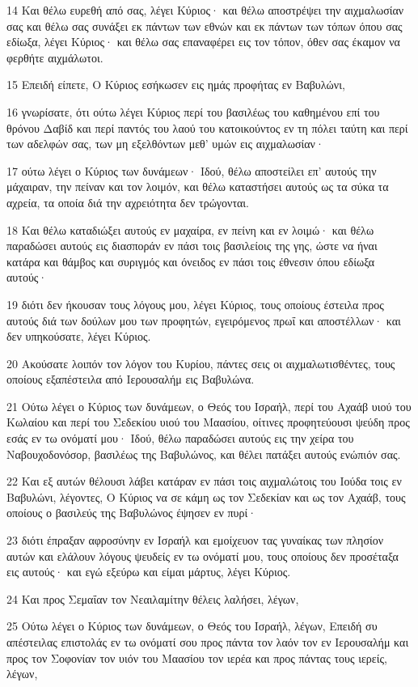 \par 14 Και θέλω ευρεθή από σας, λέγει Κύριος· και θέλω αποστρέψει την αιχμαλωσίαν σας και θέλω σας συνάξει εκ πάντων των εθνών και εκ πάντων των τόπων όπου σας εδίωξα, λέγει Κύριος· και θέλω σας επαναφέρει εις τον τόπον, όθεν σας έκαμον να φερθήτε αιχμάλωτοι.
\par 15 Επειδή είπετε, Ο Κύριος εσήκωσεν εις ημάς προφήτας εν Βαβυλώνι,
\par 16 γνωρίσατε, ότι ούτω λέγει Κύριος περί του βασιλέως του καθημένου επί του θρόνου Δαβίδ και περί παντός του λαού του κατοικούντος εν τη πόλει ταύτη και περί των αδελφών σας, των μη εξελθόντων μεθ' υμών εις αιχμαλωσίαν·
\par 17 ούτω λέγει ο Κύριος των δυνάμεων· Ιδού, θέλω αποστείλει επ' αυτούς την μάχαιραν, την πείναν και τον λοιμόν, και θέλω καταστήσει αυτούς ως τα σύκα τα αχρεία, τα οποία διά την αχρειότητα δεν τρώγονται.
\par 18 Και θέλω καταδιώξει αυτούς εν μαχαίρα, εν πείνη και εν λοιμώ· και θέλω παραδώσει αυτούς εις διασποράν εν πάσι τοις βασιλείοις της γης, ώστε να ήναι κατάρα και θάμβος και συριγμός και όνειδος εν πάσι τοις έθνεσιν όπου εδίωξα αυτούς·
\par 19 διότι δεν ήκουσαν τους λόγους μου, λέγει Κύριος, τους οποίους έστειλα προς αυτούς διά των δούλων μου των προφητών, εγειρόμενος πρωΐ και αποστέλλων· και δεν υπηκούσατε, λέγει Κύριος.
\par 20 Ακούσατε λοιπόν τον λόγον του Κυρίου, πάντες σεις οι αιχμαλωτισθέντες, τους οποίους εξαπέστειλα από Ιερουσαλήμ εις Βαβυλώνα.
\par 21 Ούτω λέγει ο Κύριος των δυνάμεων, ο Θεός του Ισραήλ, περί του Αχαάβ υιού του Κωλαίου και περί του Σεδεκίου υιού του Μαασίου, οίτινες προφητεύουσι ψεύδη προς εσάς εν τω ονόματί μου· Ιδού, θέλω παραδώσει αυτούς εις την χείρα του Ναβουχοδονόσορ, βασιλέως της Βαβυλώνος, και θέλει πατάξει αυτούς ενώπιόν σας.
\par 22 Και εξ αυτών θέλουσι λάβει κατάραν εν πάσι τοις αιχμαλώτοις του Ιούδα τοις εν Βαβυλώνι, λέγοντες, Ο Κύριος να σε κάμη ως τον Σεδεκίαν και ως τον Αχαάβ, τους οποίους ο βασιλεύς της Βαβυλώνος έψησεν εν πυρί·
\par 23 διότι έπραξαν αφροσύνην εν Ισραήλ και εμοίχευον τας γυναίκας των πλησίον αυτών και ελάλουν λόγους ψευδείς εν τω ονόματί μου, τους οποίους δεν προσέταξα εις αυτούς· και εγώ εξεύρω και είμαι μάρτυς, λέγει Κύριος.
\par 24 Και προς Σεμαΐαν τον Νεαιλαμίτην θέλεις λαλήσει, λέγων,
\par 25 Ούτω λέγει ο Κύριος των δυνάμεων, ο Θεός του Ισραήλ, λέγων, Επειδή συ απέστειλας επιστολάς εν τω ονόματί σου προς πάντα τον λαόν τον εν Ιερουσαλήμ και προς τον Σοφονίαν τον υιόν του Μαασίου τον ιερέα και προς πάντας τους ιερείς, λέγων,
